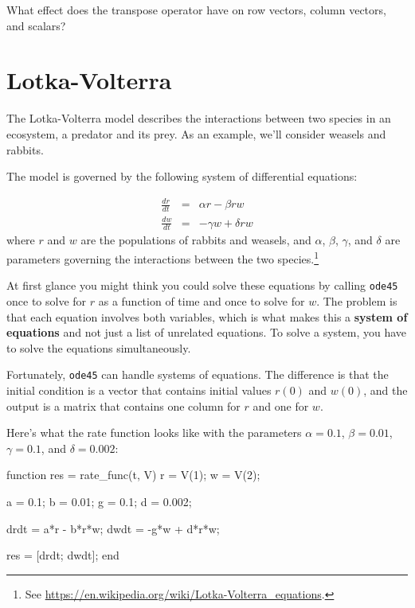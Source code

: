 \documentclass[
]{book}
\numberwithin{Answer}{chapter}
\numberwithin{Exercise}{chapter}
\begin{document}
\begin{ex}
What effect does the transpose operator
have on row vectors, column vectors, and scalars?
\end{ex}


\section{Lotka-Volterra}
\label{sect:lotka}

The Lotka-Volterra model describes the interactions between two
species in an ecosystem, a predator and its prey.  As an example, we'll consider weasels and rabbits.

The model is governed by the following system of differential equations:

\begin{eqnarray}
    \frac{dr}{dt} &=& \alpha r - \beta r w
    \\[6pt]
    \frac{dw}{dt} &=& - \gamma w + \delta r w
\end{eqnarray}
%
where $r$ and $w$ are the populations of rabbits and weasels,
and $\alpha$, $\beta$, $\gamma$, and $\delta$ are parameters
governing the interactions between the two species.\footnote{See
\url{https://en.wikipedia.org/wiki/Lotka-Volterra_equations}.}

At first glance you might think you could solve these equations by
calling {\tt ode45} once to solve for $r$ as a function of time and
once to solve for $w$.  The problem is that each equation involves
both variables, which is what makes this a {\bf system of equations}
and not just a list of unrelated equations.  To solve a system, you
have to solve the equations simultaneously.


Fortunately, {\tt ode45} can handle systems of equations.  The
difference is that the initial condition is a vector that contains
initial values $r(0)$ and $w(0)$, and the output is a matrix
that contains one column for $r$ and one for $w$.

Here's what the rate function looks like
with the parameters $\alpha = 0.1$, $\beta = 0.01$, $\gamma = 0.1$, 
and $\delta = 0.002$:

\begin{code}
function res = rate_func(t, V)
    r = V(1);
    w = V(2);

    a = 0.1;  
    b = 0.01;  
    g = 0.1;   
    d = 0.002; 

    drdt = a*r - b*r*w;
    dwdt = -g*w + d*r*w;

    res = [drdt; dwdt];
end
\end{code}
\end{document}
